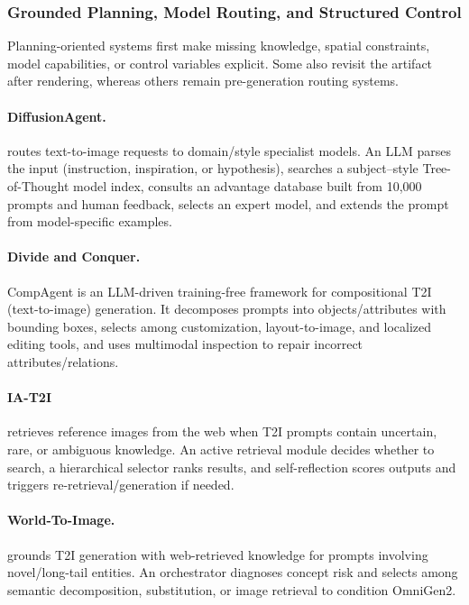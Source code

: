 \subsubsection{Grounded Planning, Model Routing, and Structured Control}
Planning-oriented systems first make missing knowledge, spatial constraints, model capabilities, or control variables explicit. Some also revisit the artifact after rendering, whereas others remain pre-generation routing systems.

\paragraph{DiffusionAgent.}
 routes text-to-image requests to domain/style specialist models. An LLM parses the input (instruction, inspiration, or hypothesis), searches a subject–style Tree-of-Thought model index, consults an advantage database built from 10,000 prompts and human feedback, selects an expert model, and extends the prompt from model-specific examples. ~\cite{qin2024diffusionagent}

\paragraph{Divide and Conquer.}
CompAgent is an LLM-driven training-free framework for compositional T2I (text-to-image) generation. It decomposes prompts into objects/attributes with bounding boxes, selects among customization, layout-to-image, and localized editing tools, and uses multimodal inspection to repair incorrect attributes/relations. ~\cite{wang2024divide}

\paragraph{IA-T2I}
 retrieves reference images from the web when T2I prompts contain uncertain, rare, or ambiguous knowledge. An active retrieval module decides whether to search, a hierarchical selector ranks results, and self-reflection scores outputs and triggers re-retrieval/generation if needed. ~\cite{li2025iat2i}

\paragraph{World-To-Image.}
 grounds T2I generation with web-retrieved knowledge for prompts involving novel/long-tail entities. An orchestrator diagnoses concept risk and selects among semantic decomposition, substitution, or image retrieval to condition OmniGen2. ~\cite{avg251004201}

